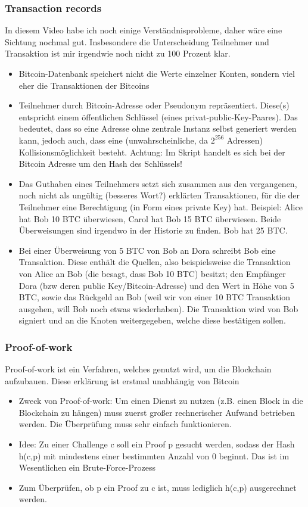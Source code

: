 \documentclass{article} %
\begin{document}
	\subsubsection{Transaction records}
	In diesem Video habe ich noch einige Verständnisprobleme, daher wäre eine Sichtung nochmal gut.
	Insbesondere die Unterscheidung Teilnehmer und Transaktion ist mir irgendwie noch nicht zu 100 Prozent klar.
	\begin{itemize}
		\item Bitcoin-Datenbank speichert nicht die Werte einzelner Konten, sondern viel eher die Transaktionen der Bitcoins
		\item Teilnehmer durch Bitcoin-Adresse oder Pseudonym repräsentiert. 
		Diese(s) entspricht einem öffentlichen Schlüssel (eines privat-public-Key-Paares).
		Das bedeutet, dass so eine Adresse ohne zentrale Instanz selbst generiert werden kann, jedoch auch, dass eine (unwahrscheinliche, da $2^{256}$ Adressen) Kollisionsmöglichkeit besteht.
		Achtung: Im Skript handelt es sich bei der Bitcoin Adresse um den Hash des Schlüssels!
		\item Das Guthaben eines Teilnehmers setzt sich zusammen aus den vergangenen, noch nicht als ungültig (besseres Wort?) erklärten Transaktionen, für die der Teilnehmer eine Berechtigung (in Form eines private Key) hat.
		Beispiel: Alice hat Bob 10 BTC überwiesen, Carol hat Bob 15 BTC überwiesen.
		Beide Überweisungen sind irgendwo in der Historie zu finden.
		Bob hat 25 BTC.
		\item Bei einer Überweisung von 5 BTC von Bob an Dora schreibt Bob eine Transaktion.
		Diese enthält die Quellen, also beispielsweise die Transaktion von Alice an Bob (die besagt, dass Bob 10 BTC) besitzt; den Empfänger Dora (bzw deren public Key/Bitcoin-Adresse) und den Wert in Höhe von 5 BTC, sowie das Rückgeld an Bob (weil wir von einer 10 BTC Transaktion ausgehen, will Bob noch etwas wiederhaben).
		Die Transaktion wird von Bob signiert und an die Knoten weitergegeben, welche diese bestätigen sollen.
	\end{itemize}
	\subsubsection{Proof-of-work}
	Proof-of-work ist ein Verfahren, welches genutzt wird, um die Blockchain aufzubauen.
	Diese erklärung ist erstmal unabhängig von Bitcoin
	\begin{itemize}
		\item Zweck von Proof-of-work: Um einen Dienst zu nutzen (z.B. einen Block in die Blockchain zu hängen) muss zuerst großer rechnerischer Aufwand betrieben werden.
		Die Überprüfung muss sehr einfach funktionieren.
		\item Idee: Zu einer Challenge c soll ein Proof p gesucht werden, sodass der Hash h(c,p) mit mindestens einer bestimmten Anzahl von 0 beginnt.
		Das ist im Wesentlichen ein Brute-Force-Prozess
		\item Zum Überprüfen, ob p ein Proof zu c ist, muss lediglich h(c,p) ausgerechnet werden.
	\end{itemize}
\end{document}
